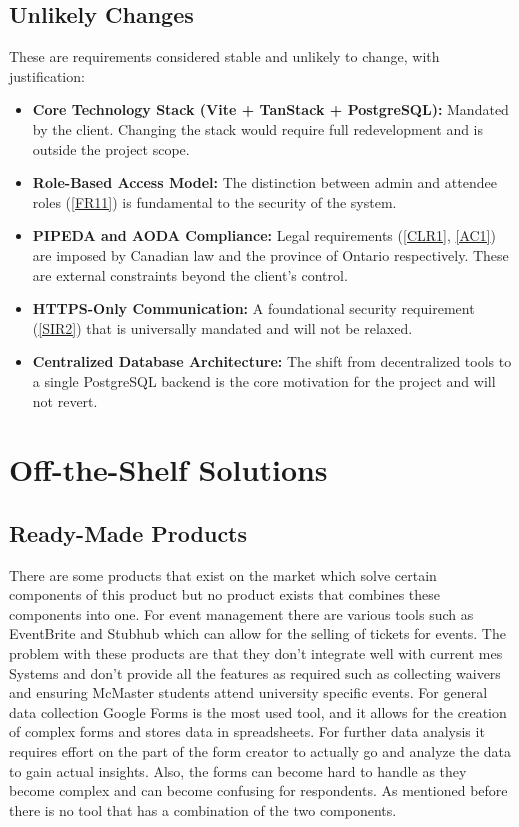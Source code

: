 \documentclass[12pt]{article}
\begin{document}
\subsection{Unlikely Changes}
These are requirements considered stable and unlikely to change, with justification:
\begin{itemize}
  \item \textbf{Core Technology Stack (Vite + TanStack + PostgreSQL):} Mandated by the 
    client. Changing the stack would require full redevelopment and is 
    outside the project scope.
  \item \textbf{Role-Based Access Model:} The distinction between admin and attendee 
    roles (\ref{FR11}) is fundamental to the security of the system.
  \item \textbf{PIPEDA and AODA Compliance:} Legal requirements (\ref{CLR1}, \ref{AC1}) 
    are imposed by Canadian law and the province of Ontario respectively. These are 
    external constraints beyond the client's control.
  \item \textbf{HTTPS-Only Communication:} A foundational security requirement 
    (\ref{SIR2}) that is universally mandated and will not be relaxed.
  \item \textbf{Centralized Database Architecture:} The shift from decentralized tools 
    to a single PostgreSQL backend is the core motivation for the project and will not 
    revert.
\end{itemize}

\section{Off-the-Shelf Solutions}
\subsection{Ready-Made Products}
There are some products that exist on the market which solve certain components of this product but no product exists
that combines these components into one. For event management there are various tools such as EventBrite and Stubhub
which can allow for the selling of tickets for events. The problem with these products are that they don't integrate
well with current \gls{mes} Systems and don't provide all the features as required such as collecting waivers and
ensuring McMaster students attend university specific events. For general data collection Google Forms is the most used
tool, and it allows for the creation of complex forms and stores data in spreadsheets. For further data analysis it
requires effort on the part of the form creator to actually go and analyze the data to gain actual insights. Also, the
forms can become hard to handle as they become complex and can become confusing for respondents. As mentioned before
there is no tool that has a combination of the two components.
\end{document}
